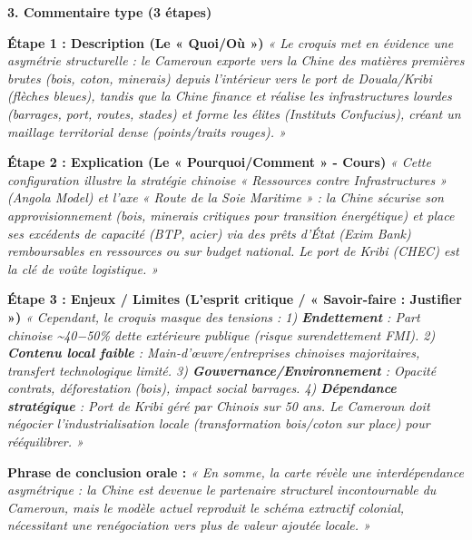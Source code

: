 \documentclass[11pt]{article}
\begin{document}
\begin{exoresolu}
\textbf{3. Commentaire type (3 étapes)}

\textbf{Étape 1 : Description (Le « Quoi/Où »)}
\emph{« Le croquis met en évidence une asymétrie structurelle : le Cameroun exporte vers la Chine des matières premières brutes (bois, coton, minerais) depuis l'intérieur vers le port de Douala/Kribi (flèches bleues), tandis que la Chine finance et réalise les infrastructures lourdes (barrages, port, routes, stades) et forme les élites (Instituts Confucius), créant un maillage territorial dense (points/traits rouges). »}

\textbf{Étape 2 : Explication (Le « Pourquoi/Comment » - Cours)}
\emph{« Cette configuration illustre la stratégie chinoise « Ressources contre Infrastructures » (Angola Model) et l'axe « Route de la Soie Maritime » : la Chine sécurise son approvisionnement (bois, minerais critiques pour transition énergétique) et place ses excédents de capacité (BTP, acier) via des prêts d'État (Exim Bank) remboursables en ressources ou sur budget national. Le port de Kribi (CHEC) est la clé de voûte logistique. »}

\textbf{Étape 3 : Enjeux / Limites (L'esprit critique / « Savoir-faire : Justifier »)}
\emph{« Cependant, le croquis masque des tensions : 1) \textbf{Endettement} : Part chinoise \textasciitilde \num{40-50}\% dette extérieure publique (risque surendettement FMI). 2) \textbf{Contenu local faible} : Main-d'œuvre/entreprises chinoises majoritaires, transfert technologique limité. 3) \textbf{Gouvernance/Environnement} : Opacité contrats, déforestation (bois), impact social barrages. 4) \textbf{Dépendance stratégique} : Port de Kribi géré par Chinois sur 50 ans. Le Cameroun doit négocier l'industrialisation locale (transformation bois/coton sur place) pour rééquilibrer. »}

\textbf{Phrase de conclusion orale :} \emph{« En somme, la carte révèle une interdépendance asymétrique : la Chine est devenue le partenaire structurel incontournable du Cameroun, mais le modèle actuel reproduit le schéma extractif colonial, nécessitant une renégociation vers plus de valeur ajoutée locale. »}
\end{exoresolu}
\end{document}

